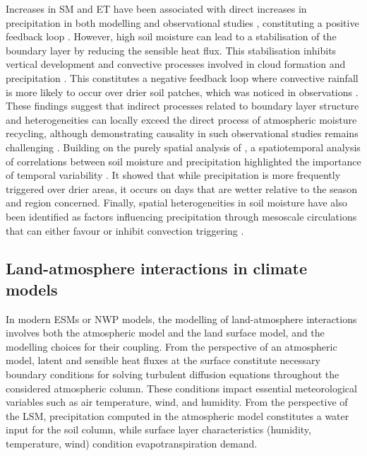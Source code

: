 Increases in SM and ET have been associated with direct increases in precipitation in both modelling and observational studies \citep{koster_observational_2003, guo_glace_2006, wei_dissecting_2012, findell_probability_2011}, constituting a positive feedback loop \citep[moisture recycling, as presented in ][]{eltahir_precipitation_1996}.
However, high soil moisture can lead to a stabilisation of the boundary layer by reducing the sensible heat flux.
This stabilisation inhibits vertical development and convective processes involved in cloud formation and precipitation \citep{findell_atmospheric_2003-1, ek_influence_2004}. 
This constitutes a negative feedback loop where convective rainfall is more likely to occur over drier soil patches, which was noticed in observations \citep{taylor_afternoon_2012, klein_dry_2020}. These findings suggest that indirect processes related to boundary layer structure and heterogeneities can locally exceed the direct process of atmospheric moisture recycling, although demonstrating causality in such observational studies remains challenging \citep{salvucci_investigating_2002, guillod_land-surface_2014}. Building on the purely spatial analysis of \citet{taylor_afternoon_2012}, a spatiotemporal analysis of correlations between soil moisture and precipitation highlighted the importance of temporal variability \citep{guillod_reconciling_2015}. It showed that while precipitation is more frequently triggered over drier areas, it occurs on days that are wetter relative to the season and region concerned.
Finally, spatial heterogeneities in soil moisture have also been identified as factors influencing precipitation through mesoscale circulations that can either favour or inhibit convection triggering \citep{findell_atmospheric_2003, taylor_frequency_2011, rochetin_morphology_2017}.

\subsection{Land-atmosphere interactions in climate models}

In modern ESMs or NWP models, the modelling of land-atmosphere interactions involves both the atmospheric model and the land surface model, and the modelling choices for their coupling.
From the perspective of an atmospheric model, latent and sensible heat fluxes at the surface constitute necessary boundary conditions for solving turbulent diffusion equations throughout the considered atmospheric column. These conditions impact essential meteorological variables such as air temperature, wind, and humidity. From the perspective of the LSM, precipitation computed in the atmospheric model constitutes a water input for the soil column, while surface layer characteristics (humidity, temperature, wind) condition evapotranspiration demand.

